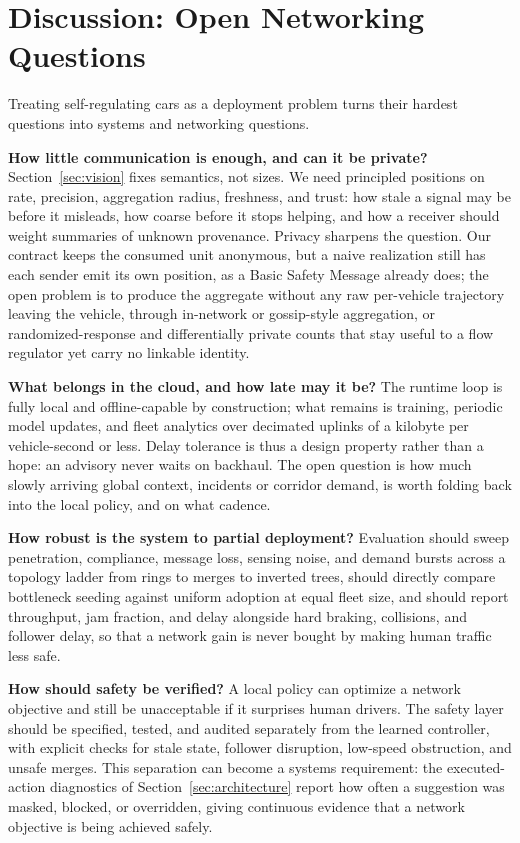 \section{Discussion: Open Networking Questions}
\label{sec:discussion}

Treating self-regulating cars as a deployment problem turns their hardest questions into systems and networking questions.

\noindent\textbf{How little communication is enough, and can it be private?}
Section~\ref{sec:vision} fixes semantics, not sizes. We need principled positions on rate, precision, aggregation radius, freshness, and trust: how stale a signal may be before it misleads, how coarse before it stops helping, and how a receiver should weight summaries of unknown provenance. Privacy sharpens the question. Our contract keeps the consumed unit anonymous, but a naive realization still has each sender emit its own position, as a Basic Safety Message already does; the open problem is to produce the aggregate without any raw per-vehicle trajectory leaving the vehicle, through in-network or gossip-style aggregation, or randomized-response and differentially private counts that stay useful to a flow regulator yet carry no linkable identity.

\noindent\textbf{What belongs in the cloud, and how late may it be?}
The runtime loop is fully local and offline-capable by construction; what remains is training, periodic model updates, and fleet analytics over decimated uplinks of a kilobyte per vehicle-second or less. Delay tolerance is thus a design property rather than a hope: an advisory never waits on backhaul. The open question is how much slowly arriving global context, incidents or corridor demand, is worth folding back into the local policy, and on what cadence.

\noindent\textbf{How robust is the system to partial deployment?}
Evaluation should sweep penetration, compliance, message loss, sensing noise, and demand bursts across a topology ladder from rings to merges to inverted trees, should directly compare bottleneck seeding against uniform adoption at equal fleet size, and should report throughput, jam fraction, and delay alongside hard braking, collisions, and follower delay, so that a network gain is never bought by making human traffic less safe.

\noindent\textbf{How should safety be verified?}
A local policy can optimize a network objective and still be unacceptable if it surprises human drivers. The safety layer should be specified, tested, and audited separately from the learned controller, with explicit checks for stale state, follower disruption, low-speed obstruction, and unsafe merges. This separation can become a systems requirement: the executed-action diagnostics of Section~\ref{sec:architecture} report how often a suggestion was masked, blocked, or overridden, giving continuous evidence that a network objective is being achieved safely.

